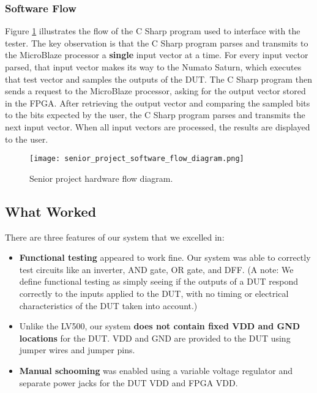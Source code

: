\subsubsection{Software Flow}

Figure \ref{fig:senior_project_software_flow} illustrates the flow of the C Sharp program used to interface with the tester. The key observation is that the C Sharp program parses and transmits to the MicroBlaze processor a \textbf{single} input vector at a time. For every input vector parsed, that input vector makes its way to the Numato Saturn, which executes that test vector and samples the outputs of the DUT. The C Sharp program then sends a request to the MicroBlaze processor, asking for the output vector stored in the FPGA. After retrieving the output vector and comparing the sampled bits to the bits expected by the user, the C Sharp program parses and transmits the next input vector. When all input vectors are processed, the results are displayed to the user.

\begin{figure}
\texttt{[image: senior\_project\_software\_flow\_diagram.png]}
\caption{Senior project hardware flow diagram.}
\label{fig:senior_project_software_flow}
\end{figure}

\subsection{What Worked}
There are three features of our system that we excelled in: 
\begin{itemize}
\item \textbf{Functional testing} appeared to work fine. Our system was able to correctly test circuits like an inverter, AND gate, OR gate, and DFF. (A note: We define functional testing as simply seeing if the outputs of a DUT respond correctly to the inputs applied to the DUT, with no timing or electrical characteristics of the DUT taken into account.)
\item Unlike the LV500, our system \textbf{does not contain fixed VDD and GND locations} for the DUT. VDD and GND are provided to the DUT using jumper wires and jumper pins. 
\item \textbf{Manual schooming} was enabled using a variable voltage regulator and separate power jacks for the DUT VDD and FPGA VDD.
\end{itemize}

